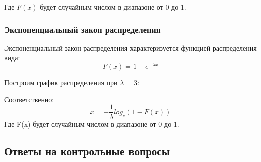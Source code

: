 \documentclass[a4paper, 14pt]{article}
\begin{document}
Где $F(x)$ будет случайным числом в диапазоне от 0 до 1.

\subsubsection{Экспоненциальный закон распределения}

Экспоненциальный закон распределения характеризуется функцией распределения вида:
\begin{equation*}
	F(x) = 1 - e^{-\lambda x}
\end{equation*}

Построим график распределения при $\lambda = 3$:


Соответственно:
\begin{equation}
	x = -\frac{1}{\lambda}log_e(1-F(x))
\end{equation}
Где F(x) будет случайным числом в диапазоне от 0 до 1.


\subsection{Ответы на контрольные вопросы}
\end{document}
